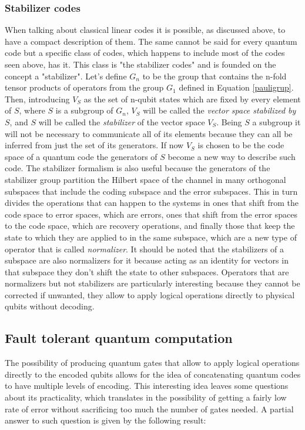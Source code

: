 \documentclass{article}
\begin{document}
\subsubsection{Stabilizer codes}
When talking about classical linear codes it is possible, as discussed above,
to have a compact description of them.
The same cannot be said for every quantum code but a specific class of
codes, which happens to include most of the codes seen above, has it.
This class is "the stabilizer codes" and is founded on the concept a
"stabilizer".
Let's define $G_n$ to be the group that contains the n-fold tensor
products of operators from the group $G_1$ defined in Equation \ref{pauligrup}.
Then, introducing $V_S$ as the set of n-qubit states which are fixed by every element of $S$,
where $S$ is a subgroup of $G_n$, $V_S$ will be called the \textit{vector space stabilized by} $S$,
and $S$ will be called the \textit{stabilizer} of the vector space $V_S$.
Being $S$ a subgroup it will not be necessary to communicate all of its elements because
they can all be inferred from just the set of its generators.
If now $V_S$ is chosen to be the code space of a quantum code the generators of
$S$ become a new way to describe such code.
The stabilizer formalism is also useful because the generators of the stabilizer group
partition the Hilbert space of the channel in many orthogonal subspaces that include the
coding subspace and the error subspaces.
This in turn divides the operations that can happen to the systems in ones that shift
from the code space to error spaces, which are errors, ones that shift from the error
spaces to the code space, which are recovery operations, and finally those that keep
the state to which they are applied to in the same subspace, which are a new type
of operator that is called \textit{normalizer}.
It should be noted that the stabilizers of a subspace are also normalizers for it
because acting as an identity for vectors in that subspace they don't shift the state
to other subspaces.
Operators that are normalizers but not stabilizers are particularly interesting because
they cannot be corrected if unwanted, they allow to apply logical operations directly to
physical qubits without decoding.




\subsection{Fault tolerant quantum computation}

The possibility of producing quantum gates that allow to apply logical operations directly
to the encoded qubits allows for the idea of concatenating quantum codes to have multiple
levels of encoding.
This interesting idea leaves some questions about its practicality, which translates in the
possibility of getting a fairly low rate of error without sacrificing too much the number
of gates needed.
A partial answer to such question is given by the following result:
\end{document}
